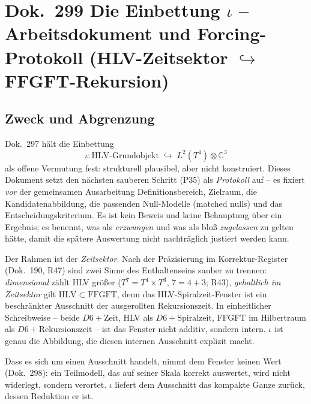 
\section*{Dok.~299 \quad Die Einbettung $\iota$ -- Arbeitsdokument und
Forcing-Protokoll (HLV-Zeitsektor $\hookrightarrow$ FFGFT-Rekursion)}

\subsection*{Zweck und Abgrenzung}

Dok.~297 hält die Einbettung
\begin{equation}
  \iota\colon \text{HLV-Grundobjekt} \;\hookrightarrow\;
  L^2(T^4)\otimes\mathbb{C}^3
\end{equation}
als offene Vermutung fest: strukturell plausibel, aber nicht konstruiert.
Dieses Dokument setzt den nächsten sauberen Schritt (P35) als
\emph{Protokoll} auf -- es fixiert \emph{vor} der gemeinsamen Ausarbeitung
Definitionsbereich, Zielraum, die Kandidatenabbildung, die passenden
Null-Modelle (matched nulls) und das Entscheidungskriterium. Es ist kein
Beweis und keine Behauptung über ein Ergebnis; es benennt, was als
\emph{erzwungen} und was als bloß \emph{zugelassen} zu gelten hätte, damit die
spätere Auswertung nicht nachträglich justiert werden kann.

Der Rahmen ist der \emph{Zeitsektor}. Nach der Präzisierung im
Korrektur-Register (Dok.~190, R47) sind zwei Sinne des Enthaltenseins
sauber zu trennen: \emph{dimensional} zählt HLV größer
($T^7 = T^4\times T^3$, $7 = 4+3$; R43), \emph{gehaltlich im Zeitsektor} gilt
$\mathrm{HLV}\subset\mathrm{FFGFT}$, denn das HLV-Spiralzeit-Fenster ist ein
beschränkter Ausschnitt der ausgerollten Rekursionszeit. In einheitlicher
Schreibweise -- beide $D6 + \text{Zeit}$, HLV als $D6 + \text{Spiralzeit}$,
FFGFT im Hilbertraum als $D6 + \text{Rekursionszeit}$ -- ist das Fenster nicht
additiv, sondern intern. $\iota$ ist genau die Abbildung, die diesen internen
Ausschnitt explizit macht.

Dass es sich um einen Ausschnitt handelt, nimmt dem Fenster keinen Wert
(Dok.~298): ein Teilmodell, das auf seiner Skala korrekt auswertet, wird
nicht widerlegt, sondern verortet. $\iota$ liefert dem Ausschnitt das
kompakte Ganze zurück, dessen Reduktion er ist.

